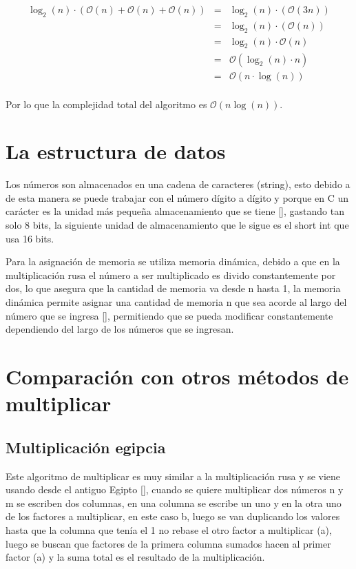\documentclass[10pt,journal,compsoc]{IEEEtran}
\begin{document}
\[
\begin{array}{lcl}
\log _2(n) \cdot ( \mathcal{O}(n) + \mathcal{O}(n) +\mathcal{O}(n)) & = & \log _2(n) \cdot ( \mathcal{O}(3n))\\
& = & \log _2(n) \cdot ( \mathcal{O}(n))\\
& = & \log _2(n) \cdot \mathcal{O}(n)\\
& = &  \mathcal{O}(\log _2(n) \cdot n)\\
& = &  \mathcal{O}(n \cdot \log (n) )\\
\end{array}
\]

Por lo que la complejidad total del algoritmo es $\mathcal{O}(n \log (n))$.


\section{La estructura de datos}

Los números son almacenados en una cadena de caracteres (string), esto debido a de esta manera se puede trabajar con el número dígito a dígito y porque en C un carácter es la unidad más pequeña almacenamiento que se tiene [\cite{ISO/IEC9899}], gastando tan solo 8 bits, la siguiente unidad de almacenamiento que le sigue es el short int que usa 16 bits.

Para la asignación de memoria se utiliza memoria dinámica, debido a que en la multiplicación rusa el número a ser multiplicado es divido constantemente por dos, lo que asegura que la cantidad de memoria va desde n hasta 1, la memoria dinámica permite asignar una cantidad de memoria n que sea acorde al largo del número que se ingresa [\cite{ISO/IEC9899}], permitiendo que se pueda modificar constantemente dependiendo del largo de los números que se ingresan.

\section{Comparación con otros métodos de multiplicar}

\subsection{Multiplicación egipcia}

Este algoritmo de multiplicar es muy similar a la multiplicación rusa y se viene usando desde el antiguo Egipto [\cite{DP06}], cuando se quiere multiplicar dos números n y m se escriben dos columnas, en una columna se escribe un uno y en la otra uno de los factores a multiplicar, en este caso b, luego se van duplicando los valores hasta que la columna que tenía el 1 no rebase el otro factor a multiplicar (a), luego se buscan que factores de la primera columna sumados hacen al primer factor (a) y la suma total es el resultado de la multiplicación.
\end{document}
